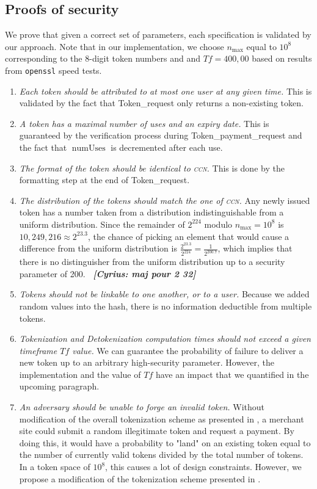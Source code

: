 \documentclass{llncs}
\DeclareMathOperator{\numUses}{numUses}
\newcounter{prob}
\newcommand{\cn}[1]{\emph{\bf \color{purple}~[Cyrius: #1]}}
\begin{document}
\subsection{Proofs of security}\label{sect:proof}

We prove that given a correct set of parameters, each specification is validated by our approach. Note that in our implementation, we choose $n_{\max}$ equal to $10^8$ corresponding to the 8-digit token numbers and and $Tf = 400,00$ based on results from \texttt{openssl} speed tests.
\begin{enumerate}
    \item \textit{Each token should be attributed to at most one user at any given time.} This is validated by the fact that Token\_request only returns a non-existing token.
    \item \textit{A token has a maximal number of uses and an expiry date.} This is guaranteed by the verification process during Token\_payment\_request and the fact that $\numUses$ is decremented after each use.
    \item \textit{The format of the token should be identical to \textsc{ccn}.} This is done by the formatting step at the end of Token\_request.
    \item \textit{The distribution of the tokens should match the one of \textsc{ccn}.} Any newly issued token has a number taken from a distribution indistinguishable from a uniform distribution. Since the remainder of $2^{224}$ modulo $n_{\max} = 10^8$ is $10,249,216 \approx 2^{23.3}$, the chance of picking an element that would cause a difference from the uniform distribution is $\frac{2^{23.3}}{2^{224}} = \frac{1}{2^{200.7}}$, which implies that there is no distinguisher from the uniform distribution up to a security parameter of 200. \cn{maj pour 2 32}
    \item \textit{Tokens should not be linkable to one another, or to a user.} Because we added random values into the hash, there is no information deductible from multiple tokens.
    \item \textit{Tokenization and Detokenization computation times should not exceed a given timeframe $Tf$ value.} We can guarantee the probability of failure to deliver a new token up to an arbitrary high-security parameter. However, the implementation and the value of $Tf$ have an impact that we quantified in the upcoming paragraph. 
    
    \item \textit{An adversary should be unable to forge an invalid token. } Without modification of the overall tokenization scheme as presented in \cite{ref}, a merchant site could submit a random illegitimate token and request a payment. By doing this, it would have a probability to "land" on an existing token equal to the number of currently valid tokens divided by the total number of tokens. In a token space of $10^8$, this causes a lot of design constraints. However, we propose a modification of the tokenization scheme presented in \cite{otherref}.
    
\end{enumerate}
\end{document}
